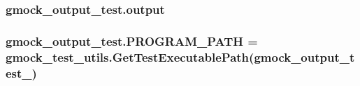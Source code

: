 \subsubsection[{\texorpdfstring{output}{output}}]{\setlength{\rightskip}{0pt plus 5cm}gmock\+\_\+output\+\_\+test.\+output}\hypertarget{namespacegmock__output__test_a4277f8598ba3835393fe82e82d09375d}{}\label{namespacegmock__output__test_a4277f8598ba3835393fe82e82d09375d}
\subsubsection[{\texorpdfstring{P\+R\+O\+G\+R\+A\+M\+\_\+\+P\+A\+TH}{PROGRAM_PATH}}]{\setlength{\rightskip}{0pt plus 5cm}gmock\+\_\+output\+\_\+test.\+P\+R\+O\+G\+R\+A\+M\+\_\+\+P\+A\+TH = {\bf gmock\+\_\+test\+\_\+utils.\+Get\+Test\+Executable\+Path}(\textquotesingle{}gmock\+\_\+output\+\_\+test\+\_\+\textquotesingle{})}\hypertarget{namespacegmock__output__test_a03aac0fac952a0b3648340f529af7f59}{}\label{namespacegmock__output__test_a03aac0fac952a0b3648340f529af7f59}
